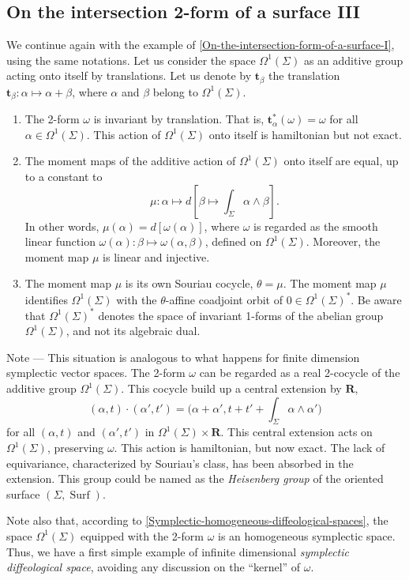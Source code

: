 \documentclass[10pt,reqno,twoside]{amsart}
\newcommand{\RR}{\mathbf{R}}
\DeclareMathOperator{\Surf}{Surf}
\newcommand{\et}{\mathbf{t}}
\theoremstyle{plain}
\theoremstyle{definition}
\newcommand{\article}[1]{\subsection{#1}}
\begin{document}
  \article{On the intersection 2-form of a surface III}
  \label{On-the-intersection-form-of-a-surface-III}
  We continue again with the example of \ref{On-the-intersection-form-of-a-surface-I},
  using the same notations.
  Let us consider the space $\Omega^1(\Sigma)$ as an additive group acting onto itself by translations.
  Let us denote by $\et_\beta$ the translation $\et_\beta : \alpha \mapsto \alpha + \beta$,
  where $\alpha$ and $\beta$ belong to $\Omega^1(\Sigma)$.
  \begin{enumerate}
    \item The 2-form $\omega$ is invariant by translation. That is, $\et_\alpha^*(\omega) = \omega$ for all $\alpha \in \Omega^1(\Sigma)$. This action of $\Omega^1(\Sigma)$ onto itself is hamiltonian but not exact.
    \item The moment maps of the additive action of $\Omega^1(\Sigma)$ onto itself are equal, up to a constant to
    $$
      \mu : \alpha \mapsto d\left[\beta \mapsto \int_\Sigma \alpha \wedge \beta \right].
      $$
    In other words, $\mu(\alpha) = d[\omega(\alpha)]$, where $\omega$ is regarded as the smooth linear function $\omega(\alpha) : \beta \mapsto \omega(\alpha,\beta)$, defined on $\Omega^1(\Sigma)$. Moreover, the moment map $\mu$ is linear and injective.
    \item The moment map $\mu$ is its own Souriau cocycle, $\theta = \mu$. The moment map $\mu$ identifies $\Omega^1(\Sigma)$ with the $\theta$-affine coadjoint orbit of $0 \in \Omega^1(\Sigma)^*$. Be aware that $\Omega^1(\Sigma)^*$ denotes the space of invariant 1-forms of the abelian group $\Omega^1(\Sigma)$, and not its algebraic dual.
  \end{enumerate}
  {\sc Note} --- This situation is analogous to what happens for finite dimension symplectic vector spaces.
  The 2-form $\omega$ can be regarded as a real 2-cocycle of the additive group $\Omega^1(\Sigma)$.
  This cocycle build up a central extension by $\RR$,
  $$
    (\alpha,t) \cdot (\alpha',t') = \bigg(\alpha + \alpha', t+t' + \int_\Sigma \alpha \wedge \alpha'\bigg)
    $$
  for all $(\alpha,t)$ and $(\alpha',t')$ in $\Omega^1(\Sigma) \times \RR$.
  This central extension acts on $\Omega^1(\Sigma)$,
  preserving $\omega$.
  This action is hamiltonian,
  but now exact.
  The lack of equivariance,
  characterized by Souriau's class,
  has been absorbed in the extension.
  This group could be named as the {\em Heisenberg group} of the oriented surface $(\Sigma,\Surf)$.
  
  Note also that,
  according to \ref{Symplectic-homogeneous-diffeological-spaces},
  the space $\Omega^1(\Sigma)$ equipped with the 2-form $\omega$ is an homogeneous symplectic space.
  Thus,
  we have a first simple example of infinite dimensional {\em symplectic diffeological space},
  avoiding any discussion on the ``kernel'' of $\omega$.
  
\end{document}
